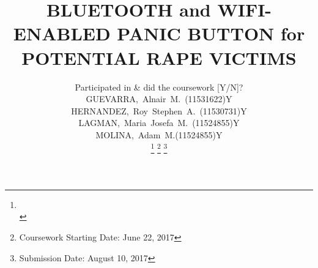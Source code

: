 




\title{BLUETOOTH and WIFI-ENABLED PANIC BUTTON for POTENTIAL RAPE VICTIMS} %

\author{
	{\small
		\begin{tabular}{l l l}
			& \multicolumn{2}{c}{\tiny \textcolor[rgb]{0.9,0.9,0.9}{Participated in \& did the coursework [Y/N]?}} 
			\\ 
			GUEVARRA,~Alnair~M.~(11531622) & Y & %
			\\ 
			HERNANDEZ,~Roy~Stephen~A.~(11530731)     & Y & %
			\\ 
			LAGMAN,~Maria~Josefa~M.~(11524855)  & Y & %
			\\
			MOLINA,~Adam~M.(11524855)  & Y & %
			\\  		
		\end{tabular}
	}
\thanks{\CrmD\protect\\} %
 \thanks{Coursework Starting Date: \hspace{1ex} June 22, 2017}
\thanks{Submission Date: \hspace{1ex} August 10, 2017}} 

%
{} %


\maketitle %


